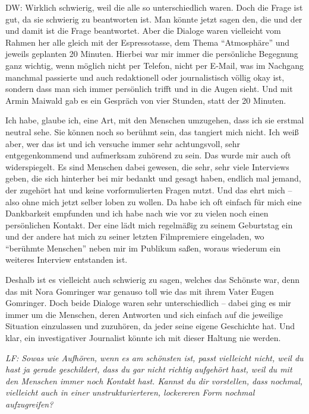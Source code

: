 \documentclass[a4paper,
fontsize=11pt,
oneside,
numbers=noperiodatend,
parskip=half-,
bibliography=totoc,
final
]{scrartcl}
\begin{document}
DW: Wirklich schwierig, weil die alle so unterschiedlich waren. Doch die
Frage ist gut, da sie schwierig zu beantworten ist. Man könnte jetzt
sagen den, die und der und damit ist die Frage beantwortet. Aber die
Dialoge waren vielleicht vom Rahmen her alle gleich mit der
Espressotasse, dem Thema \enquote{Atmosphäre} und jeweils geplanten 20
Minuten. Hierbei war mir immer die persönliche Begegnung ganz wichtig,
wenn möglich nicht per Telefon, nicht per E-Mail, was im Nachgang
manchmal passierte und auch redaktionell oder journalistisch völlig okay
ist, sondern dass man sich immer persönlich trifft und in die Augen
sieht. Und mit Armin Maiwald gab es ein Gespräch von vier Stunden, statt
der 20 Minuten.

Ich habe, glaube ich, eine Art, mit den Menschen umzugehen, dass ich sie
erstmal neutral sehe. Sie können noch so berühmt sein, das tangiert mich
nicht. Ich weiß aber, wer das ist und ich versuche immer sehr
achtungsvoll, sehr entgegenkommend und aufmerksam zuhörend zu sein. Das
wurde mir auch oft widerspiegelt. Es sind Menschen dabei gewesen, die
sehr, sehr viele Interviews geben, die sich hinterher bei mir bedankt
und gesagt haben, endlich mal jemand, der zugehört hat und keine
vorformulierten Fragen nutzt. Und das ehrt mich -- also ohne mich jetzt
selber loben zu wollen. Da habe ich oft einfach für mich eine
Dankbarkeit empfunden und ich habe nach wie vor zu vielen noch einen
persönlichen Kontakt. Der eine lädt mich regelmäßig zu seinem Geburtstag
ein und der andere hat mich zu seiner letzten Filmpremiere eingeladen,
wo \enquote{berühmte Menschen} neben mir im Publikum saßen, woraus
wiederum ein weiteres Interview entstanden ist.

Deshalb ist es vielleicht auch schwierig zu sagen, welches das Schönste
war, denn das mit Nora Gomringer war genauso toll wie das mit ihrem
Vater Eugen Gomringer. Doch beide Dialoge waren sehr unterschiedlich --
dabei ging es mir immer um die Menschen, deren Antworten und sich
einfach auf die jeweilige Situation einzulassen und zuzuhören, da jeder
seine eigene Geschichte hat. Und klar, ein investigativer Journalist
könnte ich mit dieser Haltung nie werden.

\emph{LF: Sowas wie Aufhören, wenn es am schönsten ist, passt vielleicht
nicht, weil du hast ja gerade geschildert, dass du gar nicht richtig
aufgehört hast, weil du mit den Menschen immer noch Kontakt hast. Kannst
du dir vorstellen, dass nochmal, vielleicht auch in einer
unstrukturierteren, lockereren Form nochmal aufzugreifen?}
\end{document}
